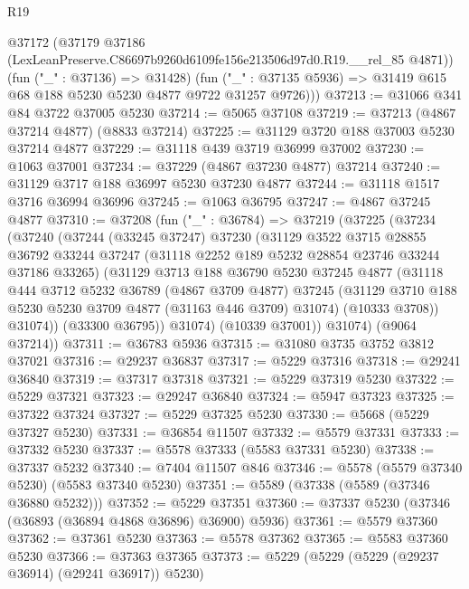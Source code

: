 \begin{lexlean}{R19}
\begin{coremodule}
      @37172
        (@37179 @37186 (LexLeanPreserve.C86697b9260d6109fe156e213506d97d0.R19.__rel_85 @4871))
        (fun ("_" : @37136) => @31428)
        (fun ("_" : @37135 @5936) => @31419 @615 @68 @188 @5230 @5230 @4877 @9722 @31257 @9726)))
@37213 := @31066 @341 @84 @3722 @37005 @5230
@37214 := @5065 @37108
@37219 := @37213 (@4867 @37214 @4877) (@8833 @37214)
@37225 := @31129 @3720 @188 @37003 @5230 @37214 @4877
@37229 := @31118 @439 @3719 @36999 @37002
@37230 := @1063 @37001
@37234 := @37229 (@4867 @37230 @4877) @37214
@37240 := @31129 @3717 @188 @36997 @5230 @37230 @4877
@37244 := @31118 @1517 @3716 @36994 @36996
@37245 := @1063 @36795
@37247 := @4867 @37245 @4877
@37310 := @37208
    (fun ("_" : @36784) =>
    @37219
      (@37225
        (@37234
          (@37240
            (@37244
              (@33245 @37247)
              @37230
              (@31129
                @3522
                @3715
                @28855
                @36792
                @33244
                @37247
                (@31118 @2252 @189 @5232 @28854 @23746 @33244 @37186 @33265)
                (@31129
                  @3713
                  @188
                  @36790
                  @5230
                  @37245
                  @4877
                  (@31118
                    @444
                    @3712
                    @5232
                    @36789
                    (@4867 @3709 @4877)
                    @37245
                    (@31129 @3710 @188 @5230 @5230 @3709 @4877 (@31163 @446 @3709) @31074)
                    (@10333 @3708))
                  @31074))
              (@33300 @36795))
            @31074)
          (@10339 @37001))
        @31074)
      (@9064 @37214))
@37311 := @36783 @5936
@37315 := @31080 @3735 @3752 @3812 @37021
@37316 := @29237 @36837
@37317 := @5229 @37316
@37318 := @29241 @36840
@37319 := @37317 @37318
@37321 := @5229 @37319 @5230
@37322 := @5229 @37321
@37323 := @29247 @36840
@37324 := @5947 @37323
@37325 := @37322 @37324
@37327 := @5229 @37325 @5230
@37330 := @5668 (@5229 @37327 @5230)
@37331 := @36854 @11507
@37332 := @5579 @37331
@37333 := @37332 @5230
@37337 := @5578 @37333 (@5583 @37331 @5230)
@37338 := @37337 @5232
@37340 := @7404 @11507 @846
@37346 := @5578 (@5579 @37340 @5230) (@5583 @37340 @5230)
@37351 := @5589 (@37338 (@5589 (@37346 @36880 @5232)))
@37352 := @5229 @37351
@37360 := @37337 @5230 (@37346 (@36893 (@36894 @4868 @36896) @36900) @5936)
@37361 := @5579 @37360
@37362 := @37361 @5230
@37363 := @5578 @37362
@37365 := @5583 @37360 @5230
@37366 := @37363 @37365
@37373 := @5229 (@5229 (@5229 (@29237 @36914) (@29241 @36917)) @5230)

\end{coremodule}
\end{lexlean}
